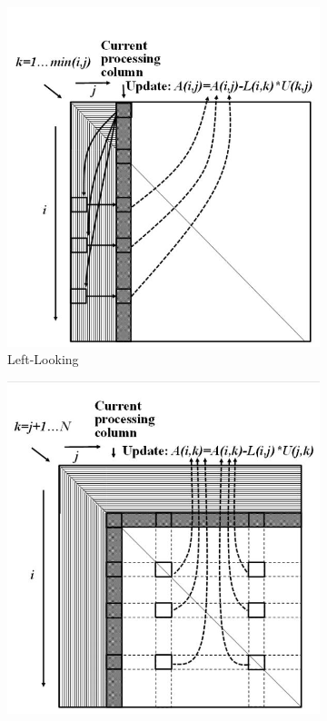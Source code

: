 \begin{figure}[H]
    \centering
    \begin{subfigure}[b]{0.33\textwidth}
        \includegraphics[width = 0.95\linewidth]{./Theory/leftLooking.JPG}
        \caption{Left-Looking}
        \label{fig:LUD:leftLooking}
    \end{subfigure}%
    \begin{subfigure}[b]{0.33\textwidth}
        \includegraphics[width = 0.95\linewidth]{./Theory/rightLooking.JPG}

\end{subfigure}
\end{figure}
